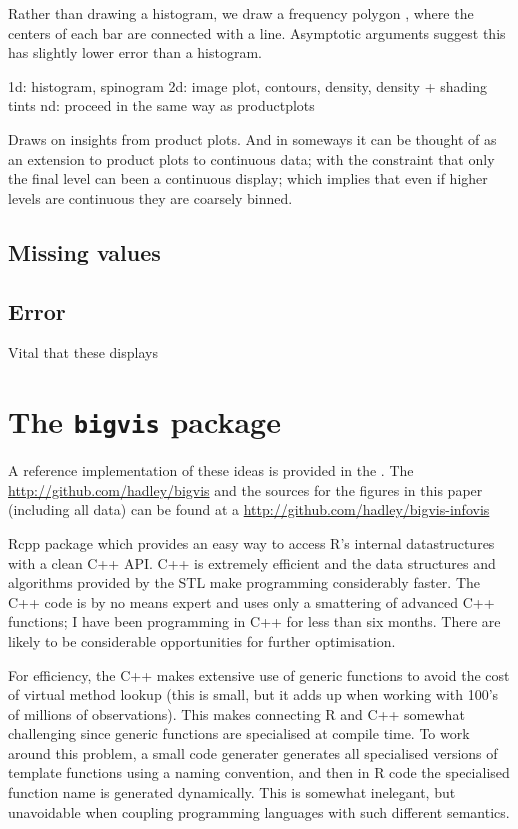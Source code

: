 \documentclass[journal]{vgtc}                %
\begin{document}
Rather than drawing a histogram, we draw a frequency polygon \citep{scott:1985a}, where the centers of each bar are connected with a line.  Asymptotic arguments suggest this has slightly lower error than a histogram.

1d: histogram, spinogram
2d: image plot, contours, density, density + shading tints
nd: proceed in the same way as productplots

Draws on insights from product plots. And in someways it can be thought of as an extension to product plots to continuous data; with the constraint that only the final level can been a continuous display; which implies that even if higher levels are continuous they are coarsely binned.

\subsection{Missing values}

\subsection{Error}

Vital that these displays

\section{The {\tt bigvis} package}
\label{sec:bigvis}

A reference implementation of these ideas is provided in the .  The \url{http://github.com/hadley/bigvis} and the sources for the figures in this paper (including all data) can be found at a \url{http://github.com/hadley/bigvis-infovis}

Rcpp package which provides an easy way to access R's internal datastructures with a clean C++ API.  C++ is extremely efficient and the data structures and algorithms provided by the STL make programming considerably faster.  The C++ code is by no means expert and uses only a smattering of advanced C++ functions; I have been programming in C++ for less than six months. There are likely to be considerable opportunities for further optimisation.

For efficiency, the C++ makes extensive use of generic functions to avoid the cost of virtual method lookup (this is small, but it adds up when working with 100's of millions of observations).  This makes connecting R and C++ somewhat challenging since generic functions are specialised at compile time. To work around this problem, a small code generater generates all specialised versions of template functions using a naming convention, and then in R code the specialised function name is generated dynamically.  This is somewhat inelegant, but unavoidable when coupling programming languages with such different semantics.
\end{document}
